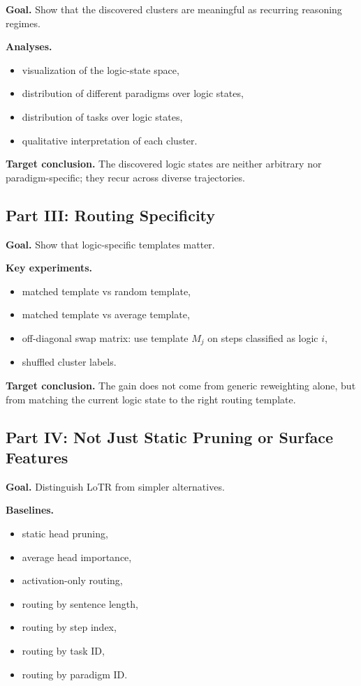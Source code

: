 \documentclass[11pt]{article}
\begin{document}
\textbf{Goal.} Show that the discovered clusters are meaningful as recurring reasoning regimes.

\textbf{Analyses.}
\begin{itemize}[leftmargin=1.5em]
    \item visualization of the logic-state space,
    \item distribution of different paradigms over logic states,
    \item distribution of tasks over logic states,
    \item qualitative interpretation of each cluster.
\end{itemize}

\textbf{Target conclusion.}
The discovered logic states are neither arbitrary nor paradigm-specific; they recur across diverse trajectories.

\subsection{Part III: Routing Specificity}

\textbf{Goal.} Show that logic-specific templates matter.

\textbf{Key experiments.}
\begin{itemize}[leftmargin=1.5em]
    \item matched template vs random template,
    \item matched template vs average template,
    \item off-diagonal swap matrix: use template $M_j$ on steps classified as logic $i$,
    \item shuffled cluster labels.
\end{itemize}

\textbf{Target conclusion.}
The gain does not come from generic reweighting alone, but from matching the current logic state to the right routing template.

\subsection{Part IV: Not Just Static Pruning or Surface Features}

\textbf{Goal.} Distinguish LoTR from simpler alternatives.

\textbf{Baselines.}
\begin{itemize}[leftmargin=1.5em]
    \item static head pruning,
    \item average head importance,
    \item activation-only routing,
    \item routing by sentence length,
    \item routing by step index,
    \item routing by task ID,
    \item routing by paradigm ID.
\end{itemize}
\end{document}
